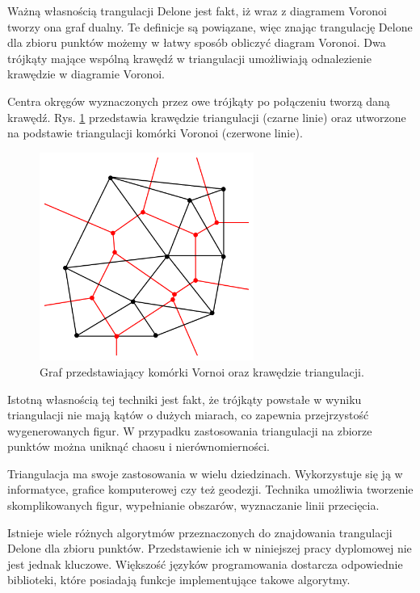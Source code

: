 Ważną własnością trangulacji Delone jest fakt, iż wraz z diagramem Voronoi tworzy ona graf dualny. Te definicje są powiązane, więc znając trangulację Delone dla zbioru punktów możemy w łatwy sposób obliczyć diagram Voronoi. Dwa trójkąty mające wspólną krawędź w triangulacji umożliwiają odnalezienie krawędzie w diagramie Voronoi. 

Centra okręgów wyznaczonych przez owe trójkąty po połączeniu tworzą daną krawędź. Rys. \ref{fig:voronoi}  przedstawia krawędzie triangulacji (czarne linie) oraz utworzone na podstawie triangulacji komórki Voronoi (czerwone linie).

\begin{figure}[h]
	\centering
	\includegraphics[width=7cm]{voronoi.png}
	\caption{Graf przedstawiający komórki Vornoi oraz krawędzie triangulacji. \cite{tDelone}} 
	\label{fig:voronoi}
\end{figure}

Istotną własnością tej techniki jest fakt, że trójkąty powstałe w wyniku triangulacji nie mają kątów o dużych miarach, co zapewnia przejrzystość wygenerowanych figur. W przypadku zastosowania triangulacji na zbiorze punktów można uniknąć chaosu i nierównomierności.

Triangulacja ma swoje zastosowania w wielu dziedzinach. Wykorzystuje się ją w informatyce, grafice komputerowej czy też geodezji. Technika umożliwia tworzenie skomplikowanych figur, wypełnianie obszarów, wyznaczanie linii przecięcia.

Istnieje wiele różnych algorytmów przeznaczonych do znajdowania trangulacji Delone dla zbioru punktów. Przedstawienie ich w niniejszej pracy dyplomowej nie jest jednak kluczowe. Większość języków programowania dostarcza odpowiednie biblioteki, które posiadają funkcje implementujące takowe algorytmy. 





